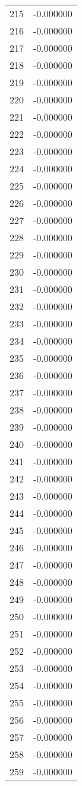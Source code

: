\documentclass[12pt]{article}
\begin{document}
\begin{longtable}{@{}cc@{}}
215 & -0.000000 \\
216 & -0.000000 \\
217 & -0.000000 \\
218 & -0.000000 \\
219 & -0.000000 \\
220 & -0.000000 \\
221 & -0.000000 \\
222 & -0.000000 \\
223 & -0.000000 \\
224 & -0.000000 \\
225 & -0.000000 \\
226 & -0.000000 \\
227 & -0.000000 \\
228 & -0.000000 \\
229 & -0.000000 \\
230 & -0.000000 \\
231 & -0.000000 \\
232 & -0.000000 \\
233 & -0.000000 \\
234 & -0.000000 \\
235 & -0.000000 \\
236 & -0.000000 \\
237 & -0.000000 \\
238 & -0.000000 \\
239 & -0.000000 \\
240 & -0.000000 \\
241 & -0.000000 \\
242 & -0.000000 \\
243 & -0.000000 \\
244 & -0.000000 \\
245 & -0.000000 \\
246 & -0.000000 \\
247 & -0.000000 \\
248 & -0.000000 \\
249 & -0.000000 \\
250 & -0.000000 \\
251 & -0.000000 \\
252 & -0.000000 \\
253 & -0.000000 \\
254 & -0.000000 \\
255 & -0.000000 \\
256 & -0.000000 \\
257 & -0.000000 \\
258 & -0.000000 \\
259 & -0.000000 \\

\end{longtable}
\end{document}
